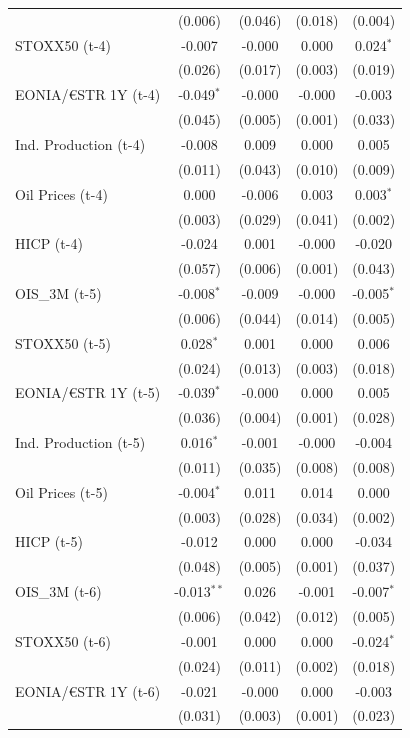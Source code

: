 \begin{longtable}[t]{lcccc}
 & (0.006) & (0.046) & (0.018) & (0.004)\\
STOXX50 (t-4) & -0.007 & -0.000 & 0.000 & 0.024$^{*}$\\
 & (0.026) & (0.017) & (0.003) & (0.019)\\
EONIA/€STR 1Y (t-4) & -0.049$^{*}$ & -0.000 & -0.000 & -0.003\\
 & (0.045) & (0.005) & (0.001) & (0.033)\\
Ind. Production (t-4) & -0.008 & 0.009 & 0.000 & 0.005\\
 & (0.011) & (0.043) & (0.010) & (0.009)\\
Oil Prices (t-4) & 0.000 & -0.006 & 0.003 & 0.003$^{*}$\\
 & (0.003) & (0.029) & (0.041) & (0.002)\\
HICP (t-4) & -0.024 & 0.001 & -0.000 & -0.020\\
 & (0.057) & (0.006) & (0.001) & (0.043)\\
OIS\_3M (t-5) & -0.008$^{*}$ & -0.009 & -0.000 & -0.005$^{*}$\\
 & (0.006) & (0.044) & (0.014) & (0.005)\\
STOXX50 (t-5) & 0.028$^{*}$ & 0.001 & 0.000 & 0.006\\
 & (0.024) & (0.013) & (0.003) & (0.018)\\
EONIA/€STR 1Y (t-5) & -0.039$^{*}$ & -0.000 & 0.000 & 0.005\\
 & (0.036) & (0.004) & (0.001) & (0.028)\\
Ind. Production (t-5) & 0.016$^{*}$ & -0.001 & -0.000 & -0.004\\
 & (0.011) & (0.035) & (0.008) & (0.008)\\
Oil Prices (t-5) & -0.004$^{*}$ & 0.011 & 0.014 & 0.000\\
 & (0.003) & (0.028) & (0.034) & (0.002)\\
HICP (t-5) & -0.012 & 0.000 & 0.000 & -0.034\\
 & (0.048) & (0.005) & (0.001) & (0.037)\\
OIS\_3M (t-6) & -0.013$^{**}$ & 0.026 & -0.001 & -0.007$^{*}$\\
 & (0.006) & (0.042) & (0.012) & (0.005)\\
STOXX50 (t-6) & -0.001 & 0.000 & 0.000 & -0.024$^{*}$\\
 & (0.024) & (0.011) & (0.002) & (0.018)\\
EONIA/€STR 1Y (t-6) & -0.021 & -0.000 & 0.000 & -0.003\\
 & (0.031) & (0.003) & (0.001) & \vphantom{1} (0.023)\\

\end{longtable}
